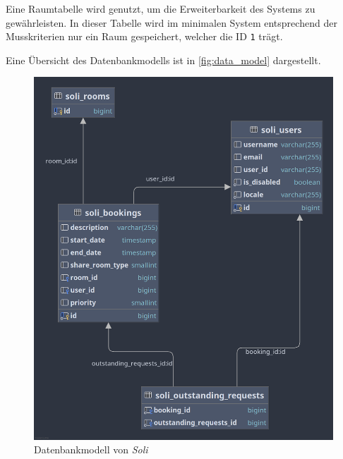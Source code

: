 Eine Raumtabelle wird genutzt, um die Erweiterbarkeit des Systems zu gewährleisten.
In dieser Tabelle wird im minimalen System entsprechend der Musskriterien nur ein Raum gespeichert, welcher die ID \texttt{1} trägt.

Eine Übersicht des Datenbankmodells ist in \autoref{fig:data_model} dargestellt.

\begin{figure}[ht]
    \centering
    \includegraphics[width=\textwidth]{figures/database}
    \caption{Datenbankmodell von \textit{Soli}}
    \label{fig:data_model}
\end{figure}
\pagebreak

